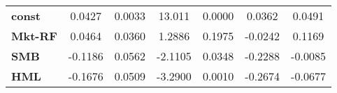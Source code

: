 \begin{center}
\begin{tabular}{lcccccc}
\midrule
\textbf{const}  &       0.0427       &       0.0033       &      13.011     &      0.0000      &       0.0362      &       0.0491       \\
\textbf{Mkt-RF} &       0.0464       &       0.0360       &      1.2886     &      0.1975      &      -0.0242      &       0.1169       \\
\textbf{SMB}    &      -0.1186       &       0.0562       &     -2.1105     &      0.0348      &      -0.2288      &      -0.0085       \\
\textbf{HML}    &      -0.1676       &       0.0509       &     -3.2900     &      0.0010      &      -0.2674      &      -0.0677       \\
\bottomrule
\end{tabular}
\end{center}
